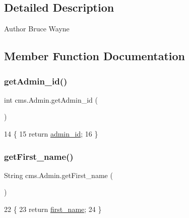 \subsection{Detailed Description}
\begin{DoxyAuthor}{Author}
Bruce Wayne 
\end{DoxyAuthor}


\subsection{Member Function Documentation}
\mbox{\label{classcms_1_1_admin_afece0488f4a49fb49db0f80192296755}} 
\subsubsection{\texorpdfstring{get\+Admin\+\_\+id()}{getAdmin\_id()}}
{\footnotesize\ttfamily int cms.\+Admin.\+get\+Admin\+\_\+id (\begin{DoxyParamCaption}{ }\end{DoxyParamCaption})\hspace{0.3cm}{\ttfamily [inline]}}


\begin{DoxyCode}
14                              \{
15         \textcolor{keywordflow}{return} \mbox{\hyperlink{classcms_1_1_admin_af3be9e8376e013a240ae51c28e7e8d6e}{admin\_id}};
16     \}
\end{DoxyCode}
\mbox{\label{classcms_1_1_admin_a5fc8f96c91c2895c0324698dc3e99298}} 
\subsubsection{\texorpdfstring{get\+First\+\_\+name()}{getFirst\_name()}}
{\footnotesize\ttfamily String cms.\+Admin.\+get\+First\+\_\+name (\begin{DoxyParamCaption}{ }\end{DoxyParamCaption})\hspace{0.3cm}{\ttfamily [inline]}}


\begin{DoxyCode}
22                                   \{
23         \textcolor{keywordflow}{return} \mbox{\hyperlink{classcms_1_1_admin_ad476f88383b7c36bfbd70be502be4202}{first\_name}};
24     \}
\end{DoxyCode}
\mbox{\label{classcms_1_1_admin_af6c98bd18bd823c8681d2829ef7e5c1c}} 
